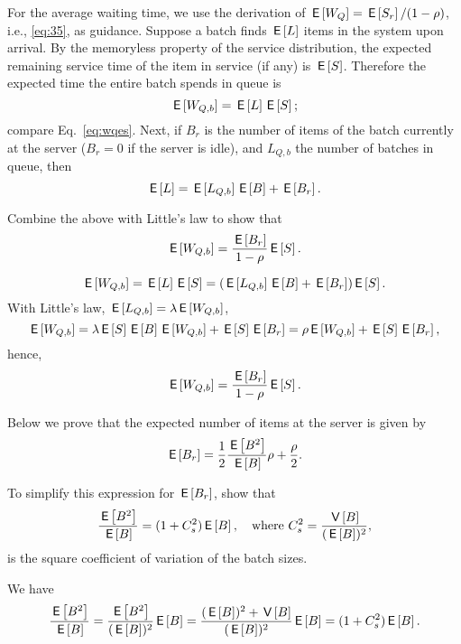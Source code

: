 For the average waiting time, we use the derivation of $\E{W_Q}=\E{S_r}/(1-\rho)$, i.e., \eqref{eq:35}, as guidance. Suppose a batch finds $\E{L}$ items in the system upon
arrival. By the memoryless property of the service distribution, the
expected remaining service time of the item in service (if any) is
$\E S$. Therefore the expected time the entire batch
spends in queue is
\begin{equation*}
  \E{W_{Q,b}} = \E{L} \E S;
\end{equation*}
compare Eq.~\eqref{eq:wqes}. 
Next, if $B_r$ is the number of items of the batch currently at the server
($B_r=0$ if the server is idle), and $L_{Q,b}$ the number of batches
in queue, then
\begin{equation*}
  \E{L} = \E{L_{Q,b}}\E B + \E{B_r}.
\end{equation*}
\begin{exercise}
  Combine the above with  Little's law to show that
  \begin{equation*}
  \E{W_{Q,b}} = \frac{\E{B_r}}{1-\rho}\E{S}.
  \end{equation*}
\begin{solution}
\begin{equation*}
  \E{W_{Q,b}} 
= \E{L} \E S  = (\E{L_{Q,b}}\E B + \E{B_r})\E S.
\end{equation*}
With  Little's law, $\E{L_{Q,b}} = \lambda \E{W_{Q,b}}$,
\begin{equation*}
  \E{W_{Q,b}} 
= \lambda \E S \E B \E{W_{Q,b}} + \E S \E{B_r} = \rho \E{W_{Q,b}} + \E S \E{B_r},
\end{equation*}
hence,
\begin{equation*}
  \E{W_{Q,b}} = \frac{\E{B_r}}{1-\rho}\E S.
\end{equation*}
\end{solution}
\end{exercise}
Below we prove that  the expected number of items at the server is given by
\begin{equation}\label{eq:br}
  \E{B_r} = \frac 1 2 \frac{\E{B^2}}{\E B}\rho + \frac\rho2.
\end{equation}


\begin{exercise}\label{q:batch}
To simplify this expression for $\E{B_r}$, show that 
\begin{equation*}
  \frac{\E{B^2}}{\E{B}} = (1+C_s^2)\E B, \quad\text{where }
C_s^2 = \frac{\V B}{(\E B)^2},
\end{equation*}
is the square coefficient of variation of the batch sizes.  
  \begin{solution}
We have
\begin{equation*}
  \begin{split}
  \frac{\E{B^2}}{\E{B}}
=    \frac{\E{B^2}}{(\E B)^2} \E B 
= \frac{(\E B)^2+\V B}{(\E B)^2}\E B = (1+C_s^2)\E B.
  \end{split}
\end{equation*}
  \end{solution}
\end{exercise}

